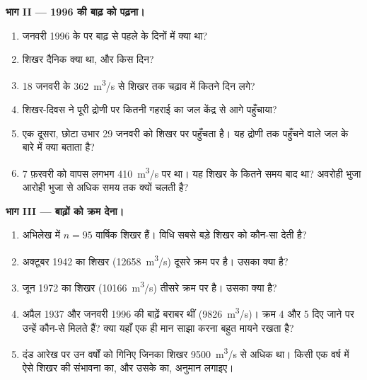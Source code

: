 \begin{problem}
\medskip
\noindent\textbf{भाग II --- 1996 की बाढ़ को पढ़ना।}
\begin{enumerate}[resume]
  \item जनवरी 1996 के  पर बाढ़ से पहले के दिनों में
         क्या था?
  \item शिखर दैनिक  क्या था, और किस दिन?
  \item 18 जनवरी के \qty{362}{m^3/s} से शिखर तक
        चढ़ाव में कितने दिन लगे?
  \item शिखर-दिवस ने पूरी द्रोणी पर कितनी गहराई का जल केंद्र
        से आगे पहुँचाया?
  \item एक दूसरा, छोटा उभार 29 जनवरी को शिखर पर पहुँचता है। यह द्रोणी तक पहुँचने वाले
        जल के बारे में क्या बताता है?
  \item 7 फ़रवरी को  वापस लगभग \qty{410}{m^3/s} पर था। यह शिखर के कितने
        समय बाद था? अवरोही भुजा आरोही भुजा से अधिक
        समय तक क्यों चलती है?
\end{enumerate}

\medskip
\noindent\textbf{भाग III --- बाढ़ों को क्रम देना।}
\begin{enumerate}[resume]
  \item अभिलेख में $n = 95$ वार्षिक शिखर हैं। विधि सबसे बड़े शिखर को कौन-सा
         देती है?
  \item अक्टूबर 1942 का शिखर (\qty{12658}{m^3/s}) दूसरे क्रम पर है। उसका
         क्या है?
  \item जून 1972 का शिखर (\qty{10166}{m^3/s}) तीसरे क्रम पर है। उसका
         क्या है?
  \item अप्रैल 1937 और जनवरी 1996 की बाढ़ें बराबर थीं
        (\qty{9826}{m^3/s})। क्रम 4 और 5 दिए जाने पर उन्हें कौन-से 
        मिलते हैं? क्या यहाँ एक ही मान साझा करना बहुत मायने रखता है?
  \item दंड आरेख पर उन वर्षों को गिनिए जिनका शिखर
        \qty{9500}{m^3/s} से अधिक था। किसी एक वर्ष में ऐसे शिखर की संभावना
        का, और उसके  का, अनुमान लगाइए।
\end{enumerate}


\end{problem}
